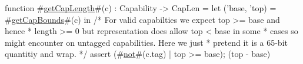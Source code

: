 function #\hyperref[sailRISCVzgetCapLength]{getCapLength}#(c) : Capability -> CapLen =
    let ('base, 'top) = #\hyperref[sailRISCVzgetCapBounds]{getCapBounds}#(c) in {
        /* For valid capabilties we expect top >= base and hence
         * length >= 0 but representation does allow top < base in some
         * cases so might encounter on untagged capabilities. Here we just
         * pretend it is a 65-bit quantitiy and wrap.
         */
        assert (#\hyperref[sailRISCVznot]{not}#(c.tag) | top >= base);
        (top - base) %
    }
